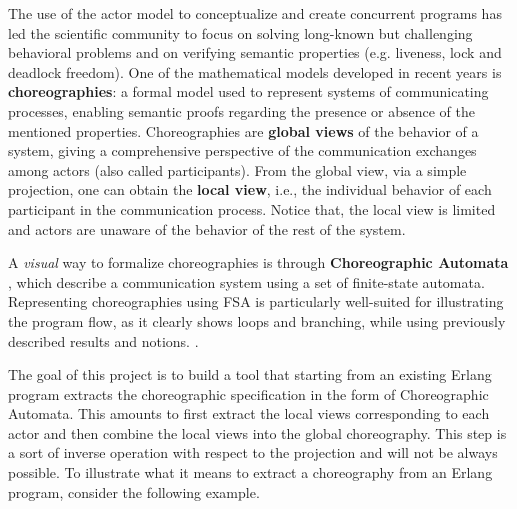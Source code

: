 The use of the actor model to conceptualize and create concurrent programs has led the scientific community to focus on solving long-known but challenging behavioral problems and on verifying semantic properties (e.g. liveness, lock and deadlock freedom). One of the mathematical models developed in recent years is \textbf{choreographies}: a formal model used to represent systems of communicating processes, enabling semantic proofs regarding the presence or absence of the mentioned properties. Choreographies are \textbf{global views} of the behavior of a system, giving a comprehensive perspective of the communication exchanges among actors (also called participants). From the global view, via a simple projection, one can obtain the \textbf{local view}, i.e., the individual behavior of each participant in the communication process. 
Notice that, the local view is limited and actors are unaware of the behavior of the rest of the system.

\bigskip

A \textit{visual} way to formalize choreographies is through \textbf{Choreographic Automata} \cite{barbanerachoreography}, which describe a communication system using a set of finite-state automata. Representing choreographies using FSA is particularly well-suited for illustrating the program flow, as it clearly shows loops and branching, while using previously described results and notions. \cite{orlando2021corinne}. 

\bigskip
The goal of this project is to build a tool that starting from an existing Erlang program extracts the choreographic specification in the form of Choreographic Automata. This  amounts to first extract the local views corresponding to each actor and then  combine the local views into the global choreography. This step  is a sort of inverse operation with respect to the projection and will not be always possible. To illustrate what it means to extract a choreography from an Erlang program, consider the following example.

